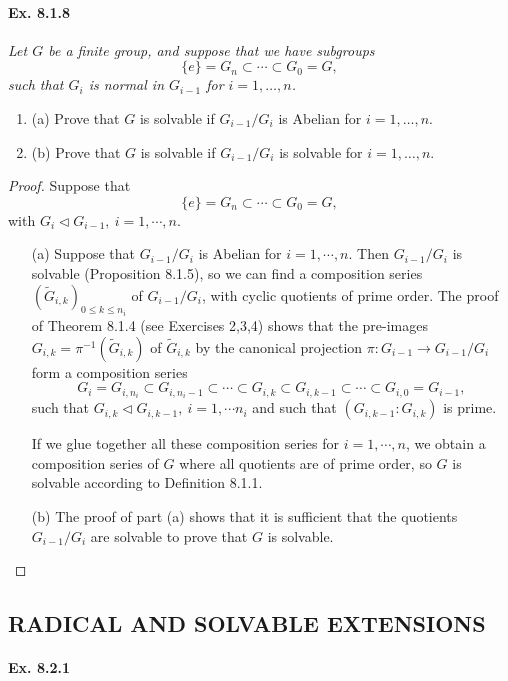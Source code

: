 \documentclass[11pt,a4paper]{article}
\newcommand{\be} {\begin{enumerate}}
\newcommand{\ee} {\end{enumerate}}
\begin{document}
\paragraph{Ex. 8.1.8}

{\it Let $G$ be a finite group, and suppose that we have subgroups
$$\{e\} = G_n \subset \cdots \subset G_0 = G,$$
such that $G_i$ is normal in $G_{i-1}$ for $i=1,\ldots,n$.
\be
\item[(a)] Prove that $G$ is solvable if $G_{i-1}/G_i$ is Abelian for $i=1,\ldots,n$.
\item[(b)] Prove that $G$ is solvable if $G_{i-1}/G_i$ is solvable for $i=1,\ldots,n$.
\ee
}

\begin{proof}
Suppose that
$$\{e\} = G_n \subset \cdots \subset G_0 = G,$$
with $G_i \lhd G_{i-1},\ i=1,\cdots,n$.
\begin{enumerate}
\item[(a)]
Suppose that $G_{i-1}/G_i$ is Abelian for $i=1,\cdots,n$.
 Then $G_{i-1}/G_i$ is solvable (Proposition 8.1.5), so we can find a composition series $(\tilde{G}_{i,k})_{0\leq k \leq n_i}$ of $G_{i-1}/G_i$, with cyclic quotients of prime order. The proof of Theorem 8.1.4 (see Exercises 2,3,4) shows that the pre-images $G_{i,k} = \pi^{-1}(\tilde{G}_{i,k})$  of $\tilde{G}_{i,k}$ by the canonical projection $\pi : G_{i-1} \to G_{i-1}/G_i$ form a composition series
$$G_i = G_{i,n_i} \subset G_{i,n_i-1}\subset \cdots \subset G_{i,k} \subset G_{i,k-1} \subset\cdots \subset G_{i,0} = G_{i-1},$$
such that $G_{i,k} \lhd G_{i,k-1}, \ i=1,\cdots n_i$ and such that $(G_{i,k-1} :G_{i,k})$ is prime.

If we glue together all these composition series for $ i=1,\cdots,n$, we obtain a composition series of $G$ where all quotients are of prime order, so $G$ is solvable according to Definition 8.1.1.
 
\item[(b)]
The proof of part (a) shows that it is sufficient that the quotients $G_{i-1}/G_i$ are solvable to prove that $G$ is solvable.
\end{enumerate}
\end{proof}

\subsection{RADICAL AND SOLVABLE EXTENSIONS}

\paragraph{Ex. 8.2.1}
\end{document}
